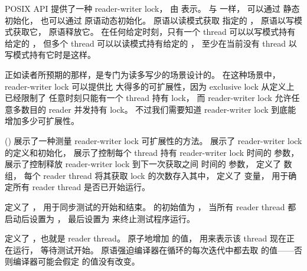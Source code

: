 POSIX API 提供了一种 reader-writer lock，
由  表示。
与  一样， 可以通过
 静态初始化，
也可以通过  原语动态初始化。
 原语以读模式获取
指定的 ，
 原语以写模式获取它，
 原语释放它。
在任何给定时刻，只有一个 thread 可以以写模式持有给定的
，
但多个 thread 可以以读模式持有给定的 ，
至少在当前没有 thread 以写模式持有它时是这样。

正如读者所预期的那样，是专门为读多写少的场景设计的。
在这种场景中，reader-writer lock 可以提供比
大得多的可扩展性，因为 exclusive lock 从定义上已经限制了
任意时刻只能有一个 thread 持有 lock，
而 reader-writer lock 允许任意多数目的 reader 并发持有 lock。
不过我们需要知道 reader-writer lock 到底能增加多少可扩展性。

\begin{listing}

\caption{测量 Reader-Writer Lock 的可扩展性}
\label{lst:toolsoftrade:Measuring Reader-Writer Lock Scalability}
\end{listing}

\begin{fcvref}
()
展示了一种测量 reader-writer lock 可扩展性的方法。
展示了 reader-writer lock 的定义和初始化，
展示了控制每个 thread 持有 reader-writer lock
时间的  参数，
展示了控制释放 reader-writer lock 到下一次获取之间
时间的  参数，
定义了  数组，
每个 reader thread 将其获取 lock 的次数存入其中，
定义了  变量，
用于确定所有 reader thread 是否已开始运行。

定义了 ，
用于同步测试的开始和结束。 的初始值为 ，
当所有 reader thread 都启动后设置为 ，
最后设置为  来终止测试程序运行。
\end{fcvref}

\begin{fcvref}
定义了 ，也就是 reader thread。
原子地增加  的值，
用来表示该 thread 现在正在运行，
等待测试开始。
 原语强迫编译器在循环的每次迭代中都去取 
的值——否则编译器可能会假定  的值没有改变。
\end{fcvref}

